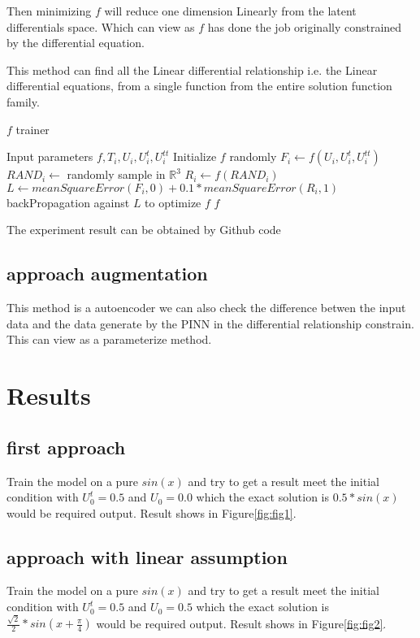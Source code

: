 \documentclass{article}
\begin{document}
Then minimizing $f$ will reduce one dimension Linearly
from the latent differentials space. Which can view as $f$ has
done the job originally constrained by the differential equation.

This method can find all the Linear differential relationship
i.e. the Linear differential equations,
from a single function from the entire solution function family.
\begin{algorithm}
    \caption{$f$ trainer}\label{algor:2}
    \begin{algorithmic}[1]
        \REQUIRE Input parameters $f,T_i, U_i, U^{t}_{i}, U^{tt}_{i}$
        \STATE Initialize $f$ randomly
        \REPEAT
        \STATE $F_i \leftarrow f(U_i,U^{t}_{i},U^{tt}_{i})$
        \STATE $RAND_i \leftarrow$ randomly sample in $\mathbb{R}^{3}$
        \STATE $R_i \leftarrow f(RAND_i)$
        \STATE $L \leftarrow meanSquareError(F_i,0)+0.1*meanSquareError(R_i,1)$
        \STATE backPropagation against $L$ to optimize $f$
        \RETURN $f$
    \end{algorithmic}
\end{algorithm}
The experiment result can be obtained by Github
code \cite[deLinearTasksSine]{deLinearTasksSine}

\subsection{approach augmentation}
This method is a autoencoder we can also check the difference
betwen the input data and the data generate by the PINN in the
differential relationship constrain. This can view as a parameterize method.

\section{Results}
\subsection{first approach}
Train the model on a pure $sin(x)$ and try to
get a result meet the initial condition with
$U^{t}_0=0.5$ and $U_0=0.0$ which the exact solution is $0.5*sin(x)$ would be
required output. Result shows in Figure\ref{fig:fig1}.
\subsection{approach with linear assumption}
Train the model on a pure $sin(x)$ and try to
get a result meet the initial condition with
$U^{t}_0=0.5$ and $U_0=0.5$ which the exact solution is $\frac{\sqrt{2}}{2}*sin(x+\frac{\pi}{4})$ would be
required output. Result shows in Figure\ref{fig:fig2}.
\end{document}
